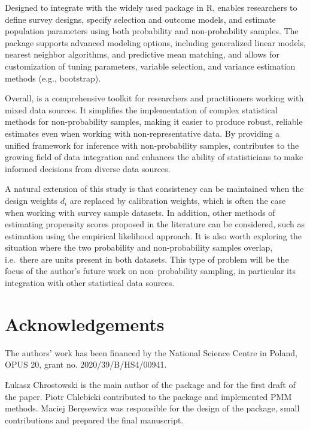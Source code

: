 \documentclass[
]{jss}
\begin{document}
Designed to integrate with the widely used  package in R,
 enables researchers to define survey designs, specify
selection and outcome models, and estimate population parameters using
both probability and non-probability samples. The package supports
advanced modeling options, including generalized linear models, nearest
neighbor algorithms, and predictive mean matching, and allows for
customization of tuning parameters, variable selection, and variance
estimation methods (e.g., bootstrap).

Overall,  is a comprehensive toolkit for researchers and
practitioners working with mixed data sources. It simplifies the
implementation of complex statistical methods for non-probability
samples, making it easier to produce robust, reliable estimates even
when working with non-representative data. By providing a unified
framework for inference with non-probability samples, 
contributes to the growing field of data integration and enhances the
ability of statisticians to make informed decisions from diverse data
sources.

A natural extension of this study is that consistency can be maintained
when the design weights \(d_i\) are replaced by calibration weights,
which is often the case when working with survey sample datasets. In
addition, other methods of estimating propensity scores proposed in the
literature can be considered, such as estimation using the empirical
likelihood approach. It is also worth exploring the situation where the
two probability and non-probability samples overlap, i.e.~there are
units present in both datasets. This type of problem will be the focus
of the author's future work on non--probability sampling, in particular
its integration with other statistical data sources.

\section{Acknowledgements}\label{sec-acknowledgements}

The authors' work has been financed by the National Science Centre in
Poland, OPUS 20, grant no. 2020/39/B/HS4/00941.

Łukasz Chrostowski is the main author of the package and for the first
draft of the paper. Piotr Chlebicki contributed to the package and
implemented PMM methods. Maciej Beręsewicz was responsible for the
design of the package, small contributions and prepared the final
manuscript.
\end{document}
